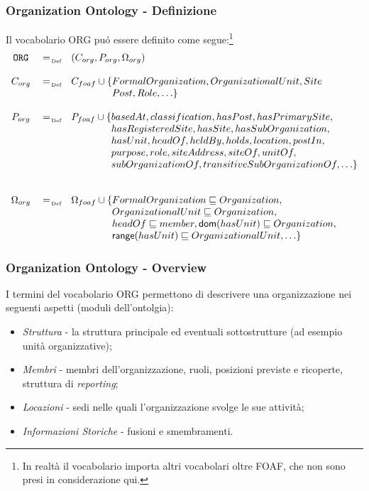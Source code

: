 \documentclass[8pt]{beamer}
\begin{document}
\begin{frame}
\frametitle{Organization Ontology - Definizione}

Il vocabolario ORG pu\'o essere definito come segue:\footnote{In realt\`a il vocabolario importa
altri vocabolari oltre FOAF, che non sono presi in considerazione qui.}
\[
 \begin{array}{ccl}
 \org & \defAs & (C_{org}, P_{org}, \Omega_{org}) \\
 &&\\
 C_{org} & \defAs & C_{foaf} \cup \{FormalOrganization, OrganizationalUnit,  Site \\
 && \phantom{C_{foaf} \cup \{}Post, Role, \ldots \}\\
 &&\\
 P_{org} & \defAs & P_{foaf} \cup \{ basedAt, classification, hasPost, hasPrimarySite, \\
 &&\phantom{P_{foaf} \cup \{}hasRegisteredSite, hasSite, hasSubOrganization, \\
 &&\phantom{P_{foaf} \cup \{}hasUnit, headOf, heldBy, holds, location, postIn,\\
 &&\phantom{P_{foaf} \cup \{}purpose, role, siteAddress, siteOf, unitOf, \\ 
 &&\phantom{P_{foaf} \cup \{}subOrganizationOf,  transitiveSubOrganizationOf, \ldots \}\\ 
 &&\phantom{P_{foaf} \cup \{}  \\
 &&\\
 \Omega_{org} & \defAs & \Omega_{foaf} \cup \{ FormalOrganization \Issub Organization, \\
 &&\phantom{\Omega_{foaf} \cup \{}OrganizationalUnit \Issub Organization,\\
 &&\phantom{\Omega_{foaf} \cup \{}headOf \Issub member, \dom(hasUnit)\Issub Organization, \\ 
 &&\phantom{\Omega_{foaf} \cup \{}\range(hasUnit) \Issub OrganizationalUnit, \ldots \}
 \end{array}
\]

\end{frame}

\begin{frame}
  \frametitle{Organization Ontology - Overview}
  I termini del vocabolario ORG permettono di descrivere una organizzazione
  nei seguenti aspetti (moduli dell'ontolgia):
  \begin{itemize}[<+->]
  \item \emph{Struttura} - la struttura principale ed eventuali sottostrutture (ad esempio 
  unit\`a organizzative);
  \item \emph{Membri} - membri dell'organizzazione, ruoli, posizioni previste e ricoperte,
  struttura di \emph{reporting};
  \item \emph{Locazioni} - sedi nelle quali l'organizzazione svolge le sue attivit\`a;
  \item \emph{Informazioni Storiche} - fusioni e smembramenti. 
  \end{itemize}
\end{frame}
\end{document}
